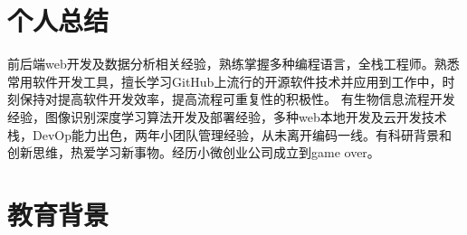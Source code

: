 \documentclass{resume}
\begin{document}


 
\section{个人总结}
前后端web开发及数据分析相关经验，熟练掌握多种编程语言，全栈工程师。熟悉常用软件开发工具，擅长学习GitHub上流行的开源软件技术并应用到工作中，时刻保持对提高软件开发效率，提高流程可重复性的积极性。
有生物信息流程开发经验，图像识别深度学习算法开发及部署经验，多种web本地开发及云开发技术栈，DevOp能力出色，两年小团队管理经验，从未离开编码一线。有科研背景和创新思维，热爱学习新事物。经历小微创业公司成立到game over。

\section{教育背景}

\end{document}
